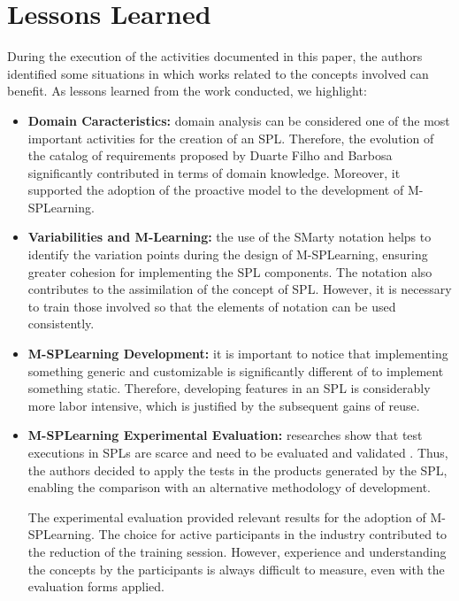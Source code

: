 \section{Lessons Learned}\label{section5}

During the execution of the activities documented in this paper, the authors identified some situations in which works related to the concepts involved can benefit. As lessons learned from the work conducted, we highlight:

\begin{itemize}
    \item \textbf{Domain Caracteristics:} domain analysis can be considered one of the most important activities for the creation of an SPL. Therefore, the evolution of the catalog of requirements proposed by Duarte Filho and Barbosa \cite{filho13} significantly contributed in terms of domain knowledge. Moreover, it supported the adoption of the proactive model to the development of M-SPLearning.
    \item \textbf{Variabilities and M-Learning:} the use of the SMarty notation helps to identify the variation points during the design of M-SPLearning, ensuring greater cohesion for implementing the SPL components. The notation also contributes to the assimilation of the concept of SPL. However, it is necessary to train those involved so that the elements of notation can be used consistently.
    \item \textbf{M-SPLearning Development:} it is important to notice that implementing something generic and customizable is significantly different of to implement something static. Therefore, developing features in an SPL is considerably more labor intensive, which is justified by the subsequent gains of reuse.
    \item \textbf{M-SPLearning Experimental Evaluation:} researches show that test executions in SPLs are scarce and need to be evaluated and validated \cite{engstrom11}. Thus, the authors decided to apply the tests in the products generated by the SPL, enabling the comparison with an alternative methodology of development.
  
    The experimental evaluation provided relevant results for the adoption of M-SPLearning. The choice for active participants in the industry contributed to the reduction of the training session. However, experience and understanding the concepts by the participants is always difficult to measure, even with the evaluation forms applied. 
\end{itemize}